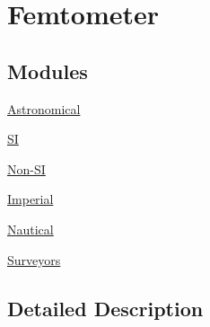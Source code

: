 \hypertarget{group___e_g_x_math-_conversions-_length_conversions-_femtometer}{}\section{Femtometer}
\label{group___e_g_x_math-_conversions-_length_conversions-_femtometer}
\subsection*{Modules}
\begin{DoxyCompactItemize}
\item 
\mbox{\hyperlink{group___e_g_x_math-_conversions-_length_conversions-_femtometer-_astronomical}{Astronomical}}
\item 
\mbox{\hyperlink{group___e_g_x_math-_conversions-_length_conversions-_femtometer-_s_i}{SI}}
\item 
\mbox{\hyperlink{group___e_g_x_math-_conversions-_length_conversions-_femtometer-_non-_s_i}{Non-\/\+SI}}
\item 
\mbox{\hyperlink{group___e_g_x_math-_conversions-_length_conversions-_femtometer-_imperial}{Imperial}}
\item 
\mbox{\hyperlink{group___e_g_x_math-_conversions-_length_conversions-_femtometer-_nautical}{Nautical}}
\item 
\mbox{\hyperlink{group___e_g_x_math-_conversions-_length_conversions-_femtometer-_surveyors}{Surveyors}}
\end{DoxyCompactItemize}


\subsection{Detailed Description}
